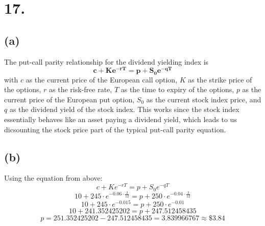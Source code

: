 \documentclass{article}
\begin{document}
{\Large 

\section*{17.}

\subsection*{(a)}

The put-call parity relationship for the dividend yielding index is 
\[
  \boxed{\mathbf{c + Ke^{-rT} = p + S_0e^{-qT}}}
\]
with \(c\) as the current price of the European call option, \(K\) as the strike price of the options, \(r\) as the risk-free rate, \(T\)  as the time to expiry of the options, \(p\) as the current price of the European put option, \(S_0\) as the current stock index price, and \(q\) as the dividend yield of the stock index. This works since the stock index essentially behaves like an asset paying a dividend yield, which leads to us dicsounting the stock price part of the typical put-call parity equation. 

\subsection*{(b)}
Using the equation from above:
\[
  c + Ke^{-rT} = p + S_0e^{-qT}
\]
\[
  10 + 245 \cdot e^{-0.06 \cdot \frac{3}{12}} = p + 250 \cdot e^{-0.04 \cdot \frac{3}{12}}
\]
\[
  10 + 245 \cdot e^{-0.015} = p + 250 \cdot e^{-0.01}
\]
\[
  10 + 241.352425202 = p + 247.512458435
\]
\[
  p = 251.352425202 - 247.512458435 = 3.839966767 \approx \boxed{\mathbf{\$3.84}}
\]

}
\end{document}
